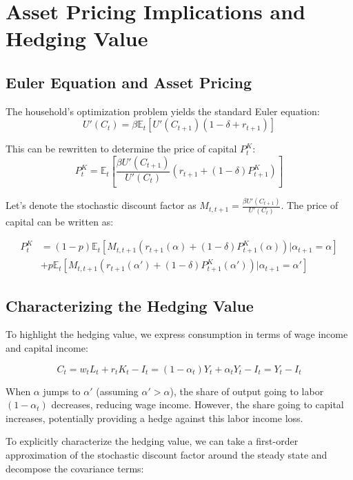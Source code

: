 \documentclass{article}
\theoremstyle{plain}    %
\theoremstyle{definition}  %
\begin{document}
\section{Asset Pricing Implications and Hedging Value}

\subsection{Euler Equation and Asset Pricing}

The household's optimization problem yields the standard Euler equation:
\begin{equation}
U'(C_t) = \beta \mathbb{E}_t[U'(C_{t+1})(1-\delta+r_{t+1})]
\end{equation}

This can be rewritten to determine the price of capital $P_t^K$:
\begin{equation}
P_t^K = \mathbb{E}_t\left[\frac{\beta U'(C_{t+1})}{U'(C_t)}(r_{t+1} + (1-\delta)P_{t+1}^K)\right]
\end{equation}

Let's denote the stochastic discount factor as $M_{t,t+1} = \frac{\beta U'(C_{t+1})}{U'(C_t)}$. The price of capital can be written as:

\begin{align}
P_t^K &= (1-p)\mathbb{E}_t[M_{t,t+1}(r_{t+1}(\alpha) + (1-\delta)P_{t+1}^K(\alpha)) | \alpha_{t+1}=\alpha] \\
&+ p\mathbb{E}_t[M_{t,t+1}(r_{t+1}(\alpha') + (1-\delta)P_{t+1}^K(\alpha')) | \alpha_{t+1}=\alpha']
\end{align}

\subsection{Characterizing the Hedging Value}

To highlight the hedging value, we express consumption in terms of wage income and capital income:

\begin{equation}
C_t = w_t L_t + r_t K_t - I_t = (1-\alpha_t)Y_t + \alpha_t Y_t - I_t = Y_t - I_t
\end{equation}

When $\alpha$ jumps to $\alpha'$ (assuming $\alpha' > \alpha$), the share of output going to labor $(1-\alpha_t)$ decreases, reducing wage income. However, the share going to capital increases, potentially providing a hedge against this labor income loss.

To explicitly characterize the hedging value, we can take a first-order approximation of the stochastic discount factor around the steady state and decompose the covariance terms:
\end{document}
